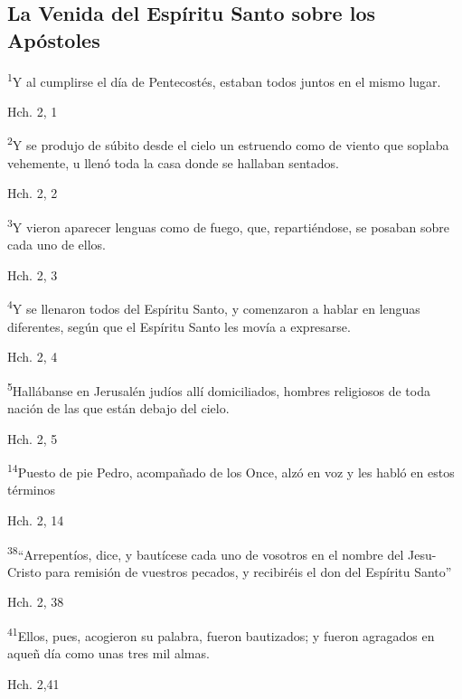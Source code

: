 \documentclass[a4paper,11pt]{article}
\begin{document}
    \subsection*{\hfil La Venida del Espíritu Santo sobre los Apóstoles \hfil}
      \textsuperscript{1}Y al cumplirse el día de Pentecostés, estaban todos juntos en el mismo lugar.
      \begin{flushright}
        Hch. 2, 1
      \end{flushright}      
      \textsuperscript{2}Y se produjo de súbito desde el cielo un estruendo como de viento que soplaba vehemente, u llenó toda la casa
      donde se hallaban sentados.
      \begin{flushright}
        Hch. 2, 2
      \end{flushright}      
      \textsuperscript{3}Y vieron aparecer lenguas como de fuego, que, repartiéndose, se posaban sobre cada uno de ellos.
      \begin{flushright}
        Hch. 2, 3
      \end{flushright}      
      \textsuperscript{4}Y se llenaron todos del Espíritu Santo, y comenzaron a hablar en lenguas diferentes, según que el Espíritu Santo les movía
      a expresarse.
      \begin{flushright}
        Hch. 2, 4
      \end{flushright}      
      \textsuperscript{5}Hallábanse en Jerusalén judíos allí domiciliados, hombres religiosos de toda nación de las que están debajo del cielo.
      \begin{flushright}
        Hch. 2, 5
      \end{flushright}      
      \textsuperscript{14}Puesto de pie Pedro, acompañado de los Once, alzó en voz y les habló en estos términos
      \begin{flushright}
        Hch. 2, 14
      \end{flushright}      
      \textsuperscript{38}``Arrepentíos, dice, y bautícese cada uno de vosotros en el nombre del Jesu-Cristo para remisión de vuestros pecados, y recibiréis el don
      del Espíritu Santo''
      \begin{flushright}
        Hch. 2, 38
      \end{flushright}      
      \textsuperscript{41}Ellos, pues, acogieron su palabra, fueron bautizados; y fueron agragados en aqueñ día como unas tres mil almas.
      \begin{flushright}
        Hch. 2,41
      \end{flushright}      
\end{document}

